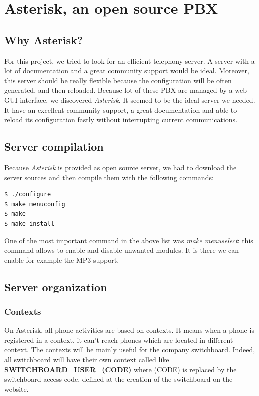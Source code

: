 \chapter{Asterisk, an open source PBX}

\section{Why Asterisk?}
For this project, we tried to look for an efficient telephony server. A server with a lot of documentation and a great community support would be ideal. Moreover, this server should be really flexible because the configuration will be often generated, and then reloaded.
Because lot of these PBX are managed by a web GUI interface, we discovered \textit{Asterisk}. It seemed to be the ideal server we needed. It have an excellent community support, a great documentation and able to reload its configuration fastly without interrupting current communications.

\section{Server compilation}
Because \textit{Asterisk} is provided as open source server, we had to download the server sources and then compile them with the following commands:
\begin{lstlisting}[language=bash,caption={bash}]
$ ./configure
$ make menuconfig
$ make
$ make install
\end{lstlisting}

One of the most important command in the above list was \textit{make menuselect}: this command allows to enable and disable unwanted modules. It is there we can enable for example the MP3 support.

\section{Server organization}

\subsection{Contexts}
On Asterisk, all phone activities are based on contexts. It means when a phone is registered in a context, it can't reach phones which are located in different context. The contexts will be mainly useful for the company switchboard. Indeed, all switchboard will have their own context called like \textbf{SWITCHBOARD\_USER\_(CODE)} where (CODE) is replaced by the switchboard access code, defined at the creation of the switchboard on the website.


